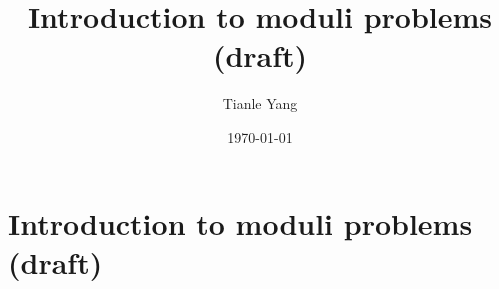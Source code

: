 \documentclass{noteformyself}
\title{Introduction to moduli problems (draft)}
\author{Tianle Yang}
\date{\today}
\begin{document}
    \maketitle

    \section{Introduction to moduli problems (draft)}



\end{document}
